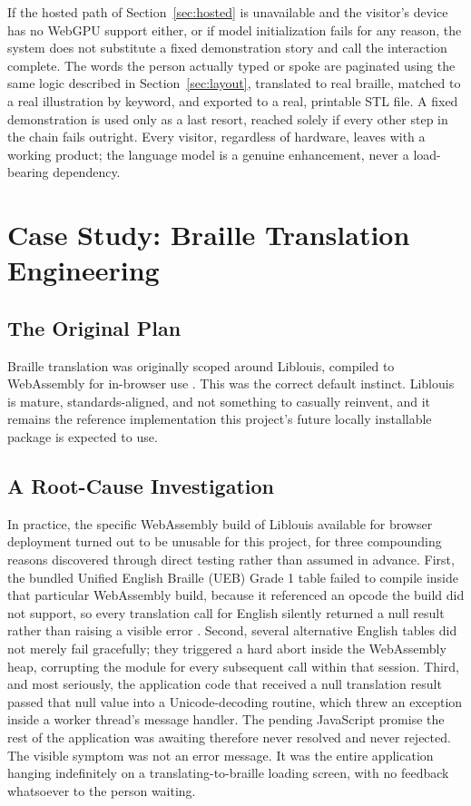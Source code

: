 \documentclass[conference]{IEEEtran}
\begin{document}
If the hosted path of Section~\ref{sec:hosted} is unavailable and the visitor's device has no WebGPU support either, or if model initialization fails for any reason, the system does not substitute a fixed demonstration story and call the interaction complete. The words the person actually typed or spoke are paginated using the same logic described in Section~\ref{sec:layout}, translated to real braille, matched to a real illustration by keyword, and exported to a real, printable STL file. A fixed demonstration is used only as a last resort, reached solely if every other step in the chain fails outright. Every visitor, regardless of hardware, leaves with a working product; the language model is a genuine enhancement, never a load-bearing dependency.

\section{Case Study: Braille Translation Engineering}\label{sec:braille}

\subsection{The Original Plan}

Braille translation was originally scoped around Liblouis, compiled to WebAssembly for in-browser use \cite{liblouis}. This was the correct default instinct. Liblouis is mature, standards-aligned, and not something to casually reinvent, and it remains the reference implementation this project's future locally installable package is expected to use.

\subsection{A Root-Cause Investigation}

In practice, the specific WebAssembly build of Liblouis available for browser deployment turned out to be unusable for this project, for three compounding reasons discovered through direct testing rather than assumed in advance. First, the bundled Unified English Braille (UEB) Grade 1 table failed to compile inside that particular WebAssembly build, because it referenced an opcode the build did not support, so every translation call for English silently returned a null result rather than raising a visible error \cite{ueb}. Second, several alternative English tables did not merely fail gracefully; they triggered a hard abort inside the WebAssembly heap, corrupting the module for every subsequent call within that session. Third, and most seriously, the application code that received a null translation result passed that null value into a Unicode-decoding routine, which threw an exception inside a worker thread's message handler. The pending JavaScript promise the rest of the application was awaiting therefore never resolved and never rejected. The visible symptom was not an error message. It was the entire application hanging indefinitely on a translating-to-braille loading screen, with no feedback whatsoever to the person waiting.
\end{document}

